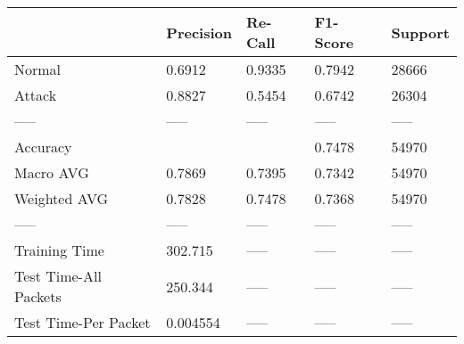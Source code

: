 \begin{tabular}{lllll}
\toprule
{} & Precision & Re-Call & F1-Score & Support \\
\midrule
Normal                &    0.6912 &  0.9335 &   0.7942 &   28666 \\
Attack                &    0.8827 &  0.5454 &   0.6742 &   26304 \\
-----                 &     ----- &   ----- &    ----- &   ----- \\
Accuracy              &           &         &   0.7478 &   54970 \\
Macro AVG             &    0.7869 &  0.7395 &   0.7342 &   54970 \\
Weighted AVG          &    0.7828 &  0.7478 &   0.7368 &   54970 \\
-----                 &     ----- &   ----- &    ----- &   ----- \\
Training Time         &   302.715 &   ----- &    ----- &   ----- \\
Test Time-All Packets &   250.344 &   ----- &    ----- &   ----- \\
Test Time-Per Packet  &  0.004554 &   ----- &    ----- &   ----- \\
\bottomrule
\end{tabular}
